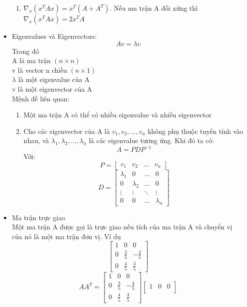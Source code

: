 \begin{itemize}
\begin{enumerate}
    \item $\nabla_x (x^TAx) = x^T(A + A^T)$. Nếu ma trận A đối xứng thì
    $\nabla_x (x^TAx) = 2x^TA$
  \end{enumerate}
  \item Eigenvalues và Eigenvectors:
  \[ Av=\lambda v \]
  Trong đó\\
  \tab A là ma trận $(n\times n)$\\
  \tab v là vector n chiều $(n\times 1)$\\
  \tab $\lambda$ là một eigenvalue của A\\
  \tab v là một eigenvector của A\\
  Mệnh đề liên quan:
  \begin{enumerate}
    \item Một ma trận A có thể có nhiều eigenvalue và nhiều eigenvector
    \item Cho các eigenvector của A là $v_1,v_2,\dots,v_n$ không phụ thuộc tuyến
    tính vào nhau, và $\lambda_1,\lambda_2,\dots,\lambda_n$ là các eigenvalue
    tương ứng. Khi đó ta có:
    \[ A = PDP^{-1} \]
    Với:
    \[ P = \begin{bmatrix} v_1 & v_2 & \dots & v_n \end{bmatrix} \]
    \[ D = 
    \begin{bmatrix} 
    \lambda_1 & 0 & \dots & 0 \\
    0 & \lambda_2 & \dots & 0 \\
    \vdots & \vdots & \ddots & \vdots \\
    0 & 0 & \dots & \lambda_n 
    \end{bmatrix} \]
  \end{enumerate}
  \item Ma trận trực giao\\
  Một ma trận A được gọi là trực giao nếu tích của ma trận A và chuyển vị của nó
  là một ma trận đơn vị. Ví dụ
  \[ \begin{bmatrix} 
    1 & 0 & 0 \\
    0 & \frac{3}{5} & -\frac{4}{5} \\
    0 & \frac{4}{5} & \frac{3}{5}
    \end{bmatrix} \]
  \[ AA^T = 
  \begin{bmatrix} 
    1 & 0 & 0 \\
    0 & \frac{3}{5} & -\frac{4}{5} \\
    0 & \frac{4}{5} & \frac{3}{5}
    \end{bmatrix}
    \begin{bmatrix} 
    1 & 0 & 0 \\

\end{bmatrix}\]
\end{itemize}
